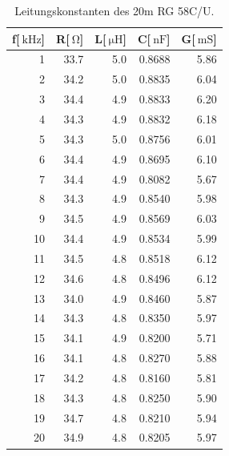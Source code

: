 \begin{table}
\centering
	\caption[]{Leitungskonstanten des 20m RG 58C/U.}
	\begin{tabular}{r r r r r}
	\toprule
		f[$\SI{}{\kilo\hertz}$] & R[$\SI{}{\ohm}$] & L[$\SI{}{\micro\henry}$] & C[$\SI{}{\nano \farad}$] & G[$\SI{}{\milli\siemens}$]\\
		\midrule
			  1	 &	33.7	&	5.0	&	0.8688	&	5.86\\
			  2	 &	34.2	&	5.0	&	0.8835	&	6.04\\
			  3	 &	34.4	&	4.9	&	0.8833	&	6.20\\
			  4	 &	34.3	&	4.9	&	0.8832	&	6.18\\
			  5	 &	34.3	&	5.0	&	0.8756	&	6.01\\
			  6	 &	34.4	&	4.9	&	0.8695	&	6.10\\
			  7	 &	34.4	&	4.9	&	0.8082	&	5.67\\
			  8	 &	34.3	&	4.9	&	0.8540	&	5.98\\
			  9	 &	34.5	&	4.9	&	0.8569	&	6.03\\
			 10  &	34.4	&	4.9	&	0.8534	&	5.99\\
			 11	 &	34.5	&	4.8	&	0.8518	&	6.12\\
			 12	 &	34.6	&	4.8	&	0.8496	&	6.12\\
			 13	 &	34.0	&	4.9	&	0.8460	&	5.87\\
			 14	 &	34.3	&	4.8	&	0.8350	&	5.97\\
			 15	 &	34.1	&	4.9	&	0.8200	&	5.71\\
			 16	 &	34.1	&	4.8	&	0.8270	&	5.88\\
			 17	 &	34.2	&	4.8	&	0.8160	&	5.81\\
			 18	 &	34.3	&	4.8	&	0.8250	&	5.90\\
			 19	 &	34.7	&	4.8	&	0.8210	&	5.94\\
			 20	 &	34.9	&	4.8	&	0.8205	&	5.97\\
			\bottomrule
	\end{tabular}
	\label{tab_konst2}
\end{table}

